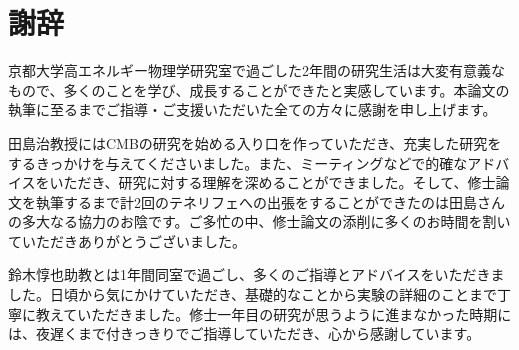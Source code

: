 \chapter{謝辞}

京都大学高エネルギー物理学研究室で過ごした2年間の研究生活は大変有意義なもので、多くのことを学び、成長することができたと実感しています。本論文の執筆に至るまでご指導・ご支援いただいた全ての方々に感謝を申し上げます。

田島治教授にはCMBの研究を始める入り口を作っていただき、充実した研究をするきっかけを与えてくださいました。また、ミーティングなどで的確なアドバイスをいただき、研究に対する理解を深めることができました。そして、修士論文を執筆するまで計2回のテネリフェへの出張をすることができたのは田島さんの多大なる協力のお陰です。ご多忙の中、修士論文の添削に多くのお時間を割いていただきありがとうございました。

鈴木惇也助教とは1年間同室で過ごし、多くのご指導とアドバイスをいただきました。日頃から気にかけていただき、基礎的なことから実験の詳細のことまで丁寧に教えていただきました。修士一年目の研究が思うように進まなかった時期には、夜遅くまで付きっきりでご指導していただき、心から感謝しています。
